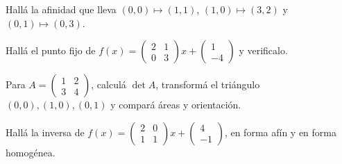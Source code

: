 \begin{ejercicio}
Hallá la afinidad que lleva \((0,0)\mapsto(1,1)\), \((1,0)\mapsto(3,2)\) y
\((0,1)\mapsto(0,3)\).
\end{ejercicio}

\begin{ejercicio}
Hallá el punto fijo de \(f(x)=\begin{pmatrix}2&1\\0&3\end{pmatrix}x+\begin{pmatrix}1\\-4\end{pmatrix}\)
y verificalo.
\end{ejercicio}

\begin{ejercicio}
Para \(A=\begin{pmatrix}1&2\\3&4\end{pmatrix}\), calculá \(\det A\), transformá el triángulo
\((0,0),(1,0),(0,1)\) y compará áreas y orientación.
\end{ejercicio}

\begin{ejercicio}
Hallá la inversa de \(f(x)=\begin{pmatrix}2&0\\1&1\end{pmatrix}x+\begin{pmatrix}4\\-1\end{pmatrix}\),
en forma afín y en forma homogénea.
\end{ejercicio}

